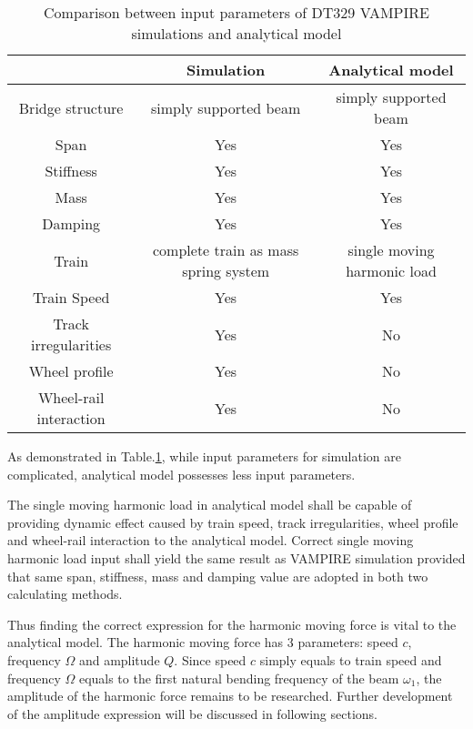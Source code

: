 \begin{table}[h!]
    \centering
    \caption{Comparison between input parameters of DT329 VAMPIRE simulations and analytical model}
    \begin{tabular}{c|cc}
        \hline
        & Simulation & Analytical model \\
        \hline
        Bridge structure & simply supported beam & simply supported beam \\
        Span & Yes & Yes \\
        Stiffness & Yes & Yes \\
        Mass & Yes & Yes \\
        Damping & Yes & Yes \\
        Train & complete train as mass spring system & single moving harmonic load \\
        Train Speed & Yes & Yes \\
        Track irregularities & Yes & No \\
        Wheel profile & Yes & No \\
        Wheel-rail interaction & Yes & No \\
        \hline
    \end{tabular}
    \label{tab:comparisonsimulationanalytical}
\end{table}

As demonstrated in Table.\ref{tab:comparisonsimulationanalytical}, while input parameters for simulation are complicated, analytical model possesses less input parameters. 

The single moving harmonic load in analytical model shall be capable of providing dynamic effect caused by train speed, track irregularities, wheel profile and wheel-rail interaction to the analytical model. Correct single moving harmonic load input shall yield the same result as VAMPIRE simulation provided that same span, stiffness, mass and damping value are adopted in both two calculating methods.

Thus finding the correct expression for the harmonic moving force is vital to the analytical model. The harmonic moving force has 3 parameters: speed $c$, frequency $\Omega$  and amplitude $Q$. Since speed $c$ simply equals to train speed and frequency $\Omega$ equals to the first natural bending frequency of the beam $\omega_1$, the amplitude of the harmonic force remains to be researched. Further development of the amplitude expression will be discussed in following sections.



